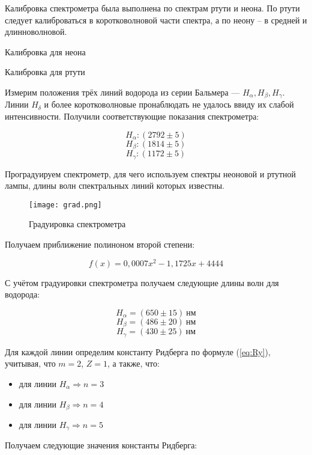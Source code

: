 Калибровка спектрометра была выполнена по спектрам ртути и неона. По ртути
следует калиброваться в коротковолновой части спектра, а по неону -- в средней и
длинноволновой.

\begin{table}[h!]
  \centering
  \caption{Калибровка для неона}
  
  \label{tb1}
\end{table}

\begin{table}[h!]
  \centering
  \caption{Калибровка для ртути}
  
  \label{tb2}
\end{table}

Измерим положения трёх линий водорода из серии Бальмера --- $H_{\alpha},
  H_{\beta}, H_{\gamma}$. Линии $H_{\delta}$ и более коротковолновые
пронаблюдать не удалось ввиду их слабой интенсивности.  Получили
соответствующие показания спектрометра:

\[  H_{\alpha}: (2792\pm 5) \]
\[  H_{\beta} : (1814 \pm 5) \]
\[ H_{\gamma} : (1172 \pm 5) \]

Проградуируем спектрометр, для чего используем спектры неоновой и ртутной
лампы, длины волн спектральных линий которых известны.

\begin{figure}[h!]
  \centering
  \texttt{[image: grad.png]}
  \caption{Градуировка спектрометра}
  \label{al}
\end{figure}

Получаем приближение полиноном второй степени:

\[ f(x) = 0,0007x^{2} -1,1725x + 4444 \]


С учётом градуировки спектрометра получаем следующие длины волн для
водорода:


\[  H_{\alpha} = (650\pm 15)\ \text{нм} \]
\[  H_{\beta} = (486\pm 20)\ \text{нм} \]
\[  H_{\gamma} = (430\pm  25)\  \text{нм} \]


Для каждой линии определим константу Ридберга по формуле (\ref{eq:Ry}),
учитывая, что $m=2$, $Z=1$, а также, что:

\newpage

\begin{itemize}
  \item для линии $H_{\alpha} \Rightarrow n=3$
  \item для линии $H_{\beta}  \Rightarrow n=4$
  \item для линии $H_{\gamma} \Rightarrow n=5$
\end{itemize}
Получаем следующие значения константы Ридберга:

